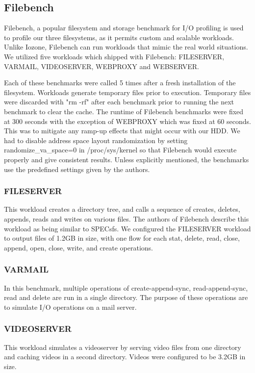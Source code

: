 \documentclass[letterpaper,twocolumn,10pt]{article}
\begin{document}
\subsection{Filebench}
Filebench, a popular filesystem and storage benchmark for I/O profiling is used to profile our three filesystems, as it permits custom and scalable workloads. Unlike Iozone, Filebench can run workloads that mimic the real world situations.  We utilized five workloads which shipped with Filebench: FILESERVER, VARMAIL, VIDEOSERVER, WEBPROXY and WEBSERVER. 

Each of these benchmarks were called 5 times after a fresh installation of the filesystem. Workloads generate temporary files prior to execution. Temporary files were discarded with "rm -rf" after each benchmark prior to running the next benchmark to clear the cache. The runtime of Filebench benchmarks were fixed at 300 seconds with the exception of WEBPROXY which was fixed at 60 seconds. This was to mitigate any ramp-up effects that might occur with our HDD. We had to disable address space layout randomization by setting randomize\_va\_space=0 in /proc/sys/kernel so that Filebench would execute properly and give consistent results. Unless explicitly mentioned, the benchmarks use the predefined settings given by the authors.

\subsubsection{FILESERVER}
This workload creates a directory tree, and calls a sequence of creates, deletes, appends, reads and writes on various files. The authors of Filebench describe this workload as being similar to SPECsfs. We configured the FILESERVER workload to output files of 1.2GB in size, with one flow for each stat, delete, read, close, append, open, close, write, and create operations.

\subsubsection{VARMAIL}
In this benchmark, multiple operations of create-append-sync, read-append-sync, read and delete are run in a single directory. The purpose of these operations are to simulate I/O operations on a mail server. 

\subsubsection{VIDEOSERVER}
This workload simulates a videoserver by serving video files from one directory and caching videos in a second directory. Videos were configured to be 3.2GB in size.
\end{document}

